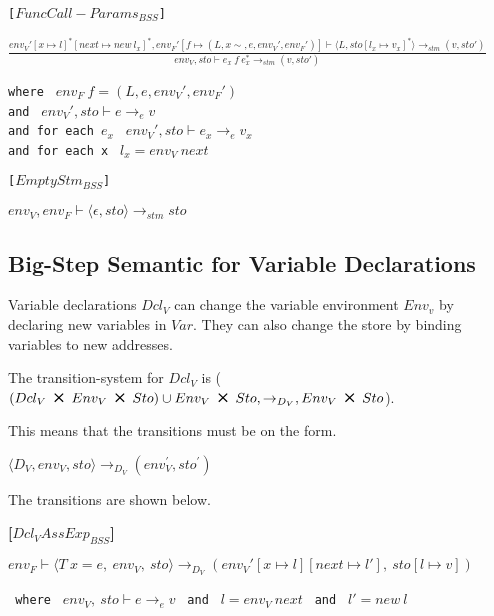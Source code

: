 \texttt{[$FuncCall-Params_{BSS}$]}
\begin{center}
	\Large
	\begin{math}
	\frac
	{env_V'[x \mapsto l]^*[next \mapsto new\ l_x]^*, env_F'[f \mapsto (L, x\sim, e, env_V', env_F')] \vdash \langle L, sto[l_x \mapsto v_x]^* \rangle \rightarrow_{stm} (v, sto')}
	{env_V, sto \vdash e_x\ f\ e_x^* \rightarrow_{stm} (v, sto')}
	\end{math}
\end{center}
\begin{center}
	\texttt{where } $env_F\ f = (L, e, env_V', env_F')$\\
	\texttt{and } $ env_V', sto \vdash e \rightarrow_{e} v$\\
	\texttt{and for each $e_x$ } $env_V', sto \vdash e_x \rightarrow_{e} v_x$ \\
	\texttt{and for each x } $l_x = env_V\ next$ 
\end{center}

\texttt{[$EmptyStm_{BSS}$]}
\begin{center}
	\begin{math}
		{env_V, env_F \vdash \langle \epsilon, sto \rangle \rightarrow_{stm} sto}
	\end{math}
\end{center}

\subsection{Big-Step Semantic for Variable Declarations}
Variable declarations $Dcl_V$ can change the variable environment $Env_v$ by declaring new variables in $Var$.
They can also change the store by binding variables to new addresses.

The transition-system for $Dcl_V$ is ($(Dcl_V\ \Cross\ Env_V\ \Cross\ Sto) \cup Env_V\ \Cross\ Sto, \rightarrow_{D_{V}}, Env_V\ \Cross\ Sto$).

This means that the transitions must be on the form.

\begin{center}
	$\langle D_V,env_V,sto \rangle \rightarrow_{D_V} (env_V^{'} , sto^{'})$
\end{center}

The transitions are shown below.

\textbf{[$Dcl_VAssExp_{BSS}$]}
\begin{center}
	\begin{math}
		{env_F \vdash \langle T\ x = e,\ env_V,\ sto \rangle \rightarrow_{D_V} (env_V'[x \mapsto l][next \mapsto l'],\ sto[l \mapsto v])}
	\end{math}
	
	\texttt{ where } $env_V,\ sto \vdash e \rightarrow_e v$
	\texttt{ and } $l = env_V\ next$
	\texttt{ and } $l' = new\ l$
\end{center}


